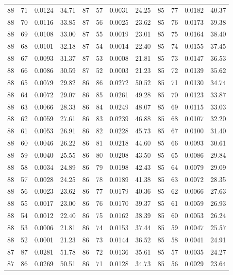 \begin{tabular}{llll|llll|llll}
88 & 71 & 0.0124 & 34.71 & 87 & 57 & 0.0031 & 24.25 & 85 & 77 & 0.0182 & 40.37\\
88 & 70 & 0.0116 & 33.85 & 87 & 56 & 0.0025 & 23.62 & 85 & 76 & 0.0173 & 39.38\\
88 & 69 & 0.0108 & 33.00 & 87 & 55 & 0.0019 & 23.01 & 85 & 75 & 0.0164 & 38.40\\
88 & 68 & 0.0101 & 32.18 & 87 & 54 & 0.0014 & 22.40 & 85 & 74 & 0.0155 & 37.45\\
88 & 67 & 0.0093 & 31.37 & 87 & 53 & 0.0008 & 21.81 & 85 & 73 & 0.0147 & 36.53\\
88 & 66 & 0.0086 & 30.59 & 87 & 52 & 0.0003 & 21.23 & 85 & 72 & 0.0139 & 35.62\\
88 & 65 & 0.0079 & 29.82 & 86 & 86 & 0.0272 & 50.52 & 85 & 71 & 0.0130 & 34.74\\
88 & 64 & 0.0072 & 29.07 & 86 & 85 & 0.0261 & 49.28 & 85 & 70 & 0.0123 & 33.87\\
88 & 63 & 0.0066 & 28.33 & 86 & 84 & 0.0249 & 48.07 & 85 & 69 & 0.0115 & 33.03\\
88 & 62 & 0.0059 & 27.61 & 86 & 83 & 0.0239 & 46.88 & 85 & 68 & 0.0107 & 32.20\\
88 & 61 & 0.0053 & 26.91 & 86 & 82 & 0.0228 & 45.73 & 85 & 67 & 0.0100 & 31.40\\
88 & 60 & 0.0046 & 26.22 & 86 & 81 & 0.0218 & 44.60 & 85 & 66 & 0.0093 & 30.61\\
88 & 59 & 0.0040 & 25.55 & 86 & 80 & 0.0208 & 43.50 & 85 & 65 & 0.0086 & 29.84\\
88 & 58 & 0.0034 & 24.89 & 86 & 79 & 0.0198 & 42.43 & 85 & 64 & 0.0079 & 29.09\\
88 & 57 & 0.0028 & 24.25 & 86 & 78 & 0.0189 & 41.38 & 85 & 63 & 0.0072 & 28.35\\
88 & 56 & 0.0023 & 23.62 & 86 & 77 & 0.0179 & 40.36 & 85 & 62 & 0.0066 & 27.63\\
88 & 55 & 0.0017 & 23.00 & 86 & 76 & 0.0170 & 39.37 & 85 & 61 & 0.0059 & 26.93\\
88 & 54 & 0.0012 & 22.40 & 86 & 75 & 0.0162 & 38.39 & 85 & 60 & 0.0053 & 26.24\\
88 & 53 & 0.0006 & 21.81 & 86 & 74 & 0.0153 & 37.44 & 85 & 59 & 0.0047 & 25.57\\
88 & 52 & 0.0001 & 21.23 & 86 & 73 & 0.0144 & 36.52 & 85 & 58 & 0.0041 & 24.91\\
87 & 87 & 0.0281 & 51.78 & 86 & 72 & 0.0136 & 35.61 & 85 & 57 & 0.0035 & 24.27\\
87 & 86 & 0.0269 & 50.51 & 86 & 71 & 0.0128 & 34.73 & 85 & 56 & 0.0029 & 23.64\\

\end{tabular}
